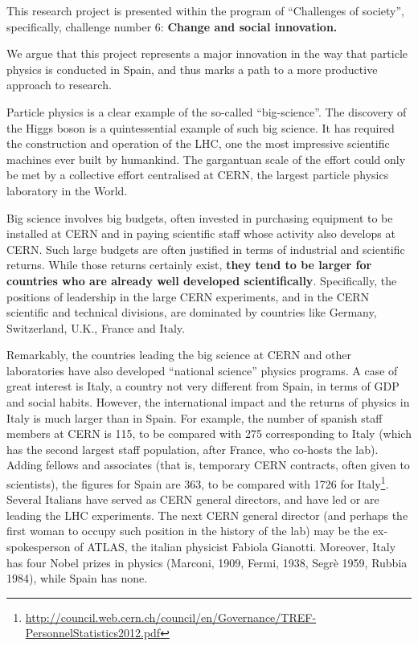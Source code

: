 %
This research project is presented within the program of ``Challenges of society'', specifically, challenge number 6: {\bf Change and social innovation.}

We argue that this project represents a major innovation in the way that particle physics is conducted in Spain, and thus marks a path to a more productive approach to research.

Particle physics is a clear example of the so-called ``big-science''. The discovery of the Higgs boson is a quintessential example of such big science. It has required the construction and operation of the LHC, one the most impressive scientific machines ever built by humankind. The gargantuan scale of the effort could only be met by a collective effort centralised at CERN, the largest particle physics laboratory in the World.  

Big science involves big budgets, often invested in purchasing equipment to be installed at CERN and in paying scientific staff whose activity also develops at CERN. Such large budgets are often justified in terms of industrial and scientific returns. While those returns certainly exist, {\bf they tend to be larger for countries who are already well developed scientifically}. Specifically, the positions of leadership in the large CERN experiments, and in the CERN scientific and technical divisions, are dominated by countries like Germany, Switzerland, U.K., France and Italy. 

Remarkably, the countries leading the big science at CERN and other laboratories have also developed ``national science'' physics programs. A case of great interest is Italy, a country not very different from Spain, in terms of GDP and social habits. However, the international impact and the returns of physics in Italy is much larger than in Spain. For example, the number of spanish staff members at CERN is 115, to be compared with 275 corresponding to Italy (which has the second largest staff population, after France, who co-hosts the lab). Adding fellows and associates (that is, temporary CERN contracts, often given to scientists), the figures for Spain are 363, to be compared with 1726 for Italy\footnote{\href{http://council.web.cern.ch/council/en/Governance/TREF-PersonnelStatistics2012.pdf}{http://council.web.cern.ch/council/en/Governance/TREF-PersonnelStatistics2012.pdf}}. Several Italians have served as CERN general directors, and have led or are leading the LHC experiments. The next CERN general director (and perhaps the first woman to occupy such position in the history of the lab) may be the ex-spokesperson of ATLAS, the italian physicist Fabiola Gianotti. Moreover, Italy has four Nobel prizes in physics (Marconi, 1909, Fermi, 1938, Segrè 1959, Rubbia 1984), while Spain has none. 

